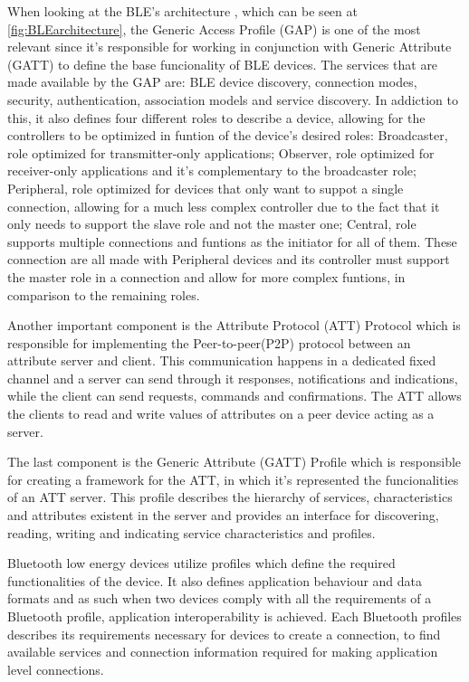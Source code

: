 \documentclass[a4paper]{IEEEtran}
\begin{document}
When looking at the BLE's architecture , which can be seen at \ref{fig:BLEarchitecture}, the Generic Access Profile (GAP) is one of the most relevant since it's responsible for working in conjunction with Generic Attribute (GATT) to define the base funcionality of BLE devices. The services that are made available by the GAP are: BLE device discovery, connection modes, security, authentication, association models and service discovery.
In addiction to this, it also defines four different roles to describe a device, allowing for the controllers to be optimized in funtion of the device's desired roles: 
Broadcaster, role optimized for transmitter-only applications; 
Observer, role optimized for receiver-only applications and it's complementary to the broadcaster role;
Peripheral, role optimized for devices that only want to suppot a single connection, allowing for a much less complex controller due to the fact that it only needs to support the slave role and not the master one; 
Central, role supports multiple connections and funtions as the initiator for all of them. These connection are all made with Peripheral devices and its controller must support the master role in a connection and allow for more complex funtions, in comparison to the remaining roles.

Another important component is the Attribute Protocol (ATT) Protocol which is responsible for implementing the Peer-to-peer(P2P) protocol between an attribute server and client. This communication happens in a dedicated fixed  channel and a server can send through it responses, notifications and indications, while the client can send requests, commands and confirmations. The ATT allows the clients to read and write values of attributes on a peer device acting as a server.

The last component is the Generic Attribute (GATT) Profile which is responsible for creating a framework for the ATT, in which it's represented the funcionalities of an ATT server. This profile describes the hierarchy of services, characteristics and attributes existent in the server and provides an interface for discovering, reading, writing and indicating service characteristics and profiles.

Bluetooth low energy devices utilize profiles which define the required functionalities of the device. It also defines application behaviour and data formats and as such when two devices comply with all the requirements of a Bluetooth profile, application interoperability is achieved. Each Bluetooth profiles describes its requirements necessary for devices to create a connection, to find available services and connection information required for making application level connections.
\end{document}
